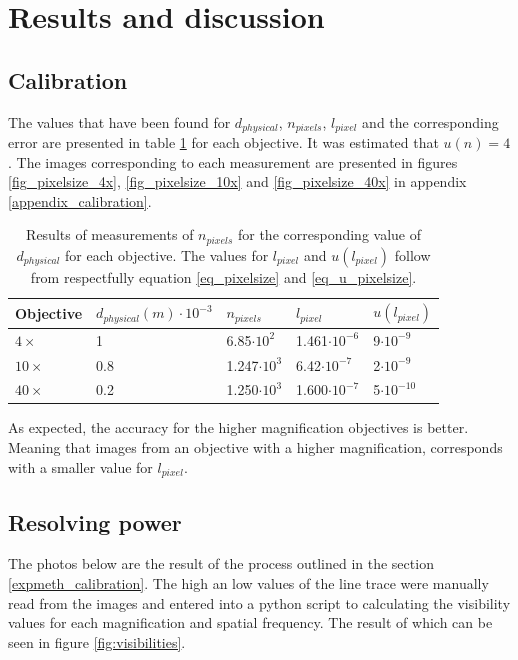 \section{Results and discussion}
\subsection{Calibration}

The values that have been found for $d_{physical}$, $n_{pixels}$, $l_{pixel}$ and the corresponding error are presented in table \ref{table_pixelsize} for each objective. It was estimated that $u(n) = 4$. The images corresponding to each measurement are presented in figures \ref{fig_pixelsize_4x}, \ref{fig_pixelsize_10x} and \ref{fig_pixelsize_40x} in appendix \ref{appendix_calibration}.

\begin{table}[h!]
\centering
\captionsetup{font=small, justification = centering}
  \caption{Results of measurements of $n_{pixels}$ for the corresponding value of $d_{physical}$ for each objective. The values for $l_{pixel}$ and $u(l_{pixel})$ follow from respectfully equation \ref{eq_pixelsize} and \ref{eq_u_pixelsize}.}
\begin{tabular}{|l|l|l|l|l|}
\hline

Objective & $d_{physical} (m) \cdot 10^{-3}$ & $n_{pixels}$ & $l_{pixel}$ & $u(l_{pixel})$ \\ \hline
$4\times$ & 1 & 6.85$\cdot 10^2$ & 1.461$\cdot 10^{-6}$ & 9$\cdot 10^{-9}$\\
$10\times$ & 0.8 & 1.247$\cdot 10^3$ & 6.42$\cdot 10^{-7}$ & 2$\cdot 10^{-9}$ \\
$40\times$ & 0.2 & 1.250$\cdot 10^3$ & 1.600$\cdot 10^{-7}$ & 5$\cdot 10^{-10}$ \\ \hline
\end{tabular}

\label{table_pixelsize}
\end{table}
As expected, the accuracy for the higher magnification objectives is better. Meaning that images from an objective with a higher magnification, corresponds with a smaller value for $l_{pixel}$.\\

\subsection{Resolving power}

The photos below are the result of the process outlined in the section \ref{expmeth_calibration}. The high an low values of the line trace were manually read from the images and entered into a python script to calculating the visibility values for each magnification and spatial frequency. The result of which can be seen in figure \ref{fig:visibilities}.\\

